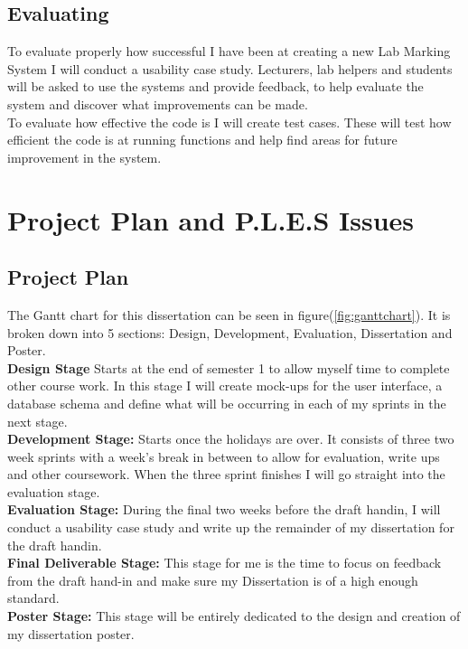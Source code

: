 \documentclass[12pt]{article}  %
\theoremstyle{definition}
\theoremstyle{remark}
\begin{document}
\subsection{Evaluating}
To evaluate properly how successful I have been at creating a new Lab Marking System I will conduct a usability case study. Lecturers, lab helpers and students will be asked to use the systems and provide feedback, to help evaluate the system and discover what improvements can be made.\\
To evaluate how effective the code is I will create test cases. These will test how efficient the code is at running functions and help find areas for future improvement in the system.







\newpage

\section{Project Plan and P.L.E.S Issues}

\subsection{Project Plan}

The Gantt chart for this dissertation can be seen in figure(\ref{fig:ganttchart}). It is broken down into 5 sections: Design, Development, Evaluation, Dissertation and Poster.\\
\textbf{Design Stage} Starts at the end of semester 1 to allow myself time to complete other course work. In this stage I will create mock-ups for the user interface, a database schema and define what will be occurring in each of my sprints in the next stage.\\
\textbf{Development Stage:} Starts once the holidays are over. It consists of three two week sprints with  a week's break in between to allow for evaluation, write ups and other coursework. When the three sprint finishes I will go straight into the evaluation stage.\\
\textbf{Evaluation Stage: } During the final two weeks before the draft handin, I will conduct a usability case study and write up the remainder of my dissertation for the draft handin.\\
\textbf{Final Deliverable Stage:} This stage  for me is the time to focus on feedback from the draft hand-in and make sure my Dissertation is of a high enough standard.\\
\textbf{Poster Stage:} This stage will be entirely dedicated to the design and creation of my dissertation poster.
\end{document}
